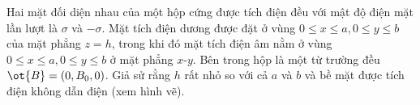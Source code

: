 \begin{vd}

Hai mặt đối diện nhau của một hộp cứng được tích điện đều với mật độ điện mặt lần lượt là $\sigma$ và $-\sigma$. Mặt tích điện dương được đặt ở vùng $0\leq x \leq a, 0 \leq y \leq b$ của mặt phẳng $z = h$, trong khi đó mặt tích điện âm nằm ở vùng $0\leq x \leq a, 0 \leq y \leq b$ ở mặt phẳng $x$-$y$. Bên trong hộp là một từ trường đều $\ot{B} = (0,B_0,0)$. Giả sử rằng $h$ rất nhỏ so với cả $a$ và $b$ và bề mặt được tích điện không dẫn điện (xem hình vẽ).
  \begin{center}

\begin{tikzpicture}[x=0.75pt,y=0.75pt,yscale=-1,xscale=1]


\end{tikzpicture}
\end{center}
\end{vd}

